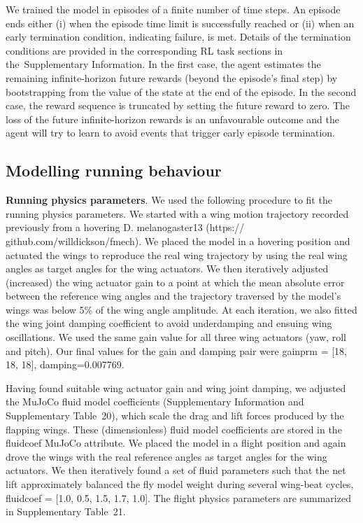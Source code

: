 \documentclass[sn-mathphys-num]{sn-jnl}%
\theoremstyle{thmstyleone}	%
\theoremstyle{thmstyletwo}	%
\theoremstyle{thmstylethree}	%
\begin{document}
We trained the model in episodes of a finite number of time steps. 
An episode ends either (i) when the episode time limit is successfully reached or (ii) when an early termination condition, indicating failure, is met. 
Details of the termination conditions are provided in the corresponding RL task sections in the Supplementary Information. 
In the first case, the agent estimates the remaining infinite-horizon future rewards (beyond the episode’s final step) by bootstrapping from the value of the state at the end of the episode. 
In the second case, the reward sequence is truncated by setting the future reward to zero. 
The loss of the future infinite-horizon rewards is an unfavourable outcome and the agent will try to learn to avoid events that trigger early episode termination.


\subsection{Modelling running behaviour}

\textbf{Running physics parameters}. 
We used the following procedure to fit the running physics parameters. 
We started with a wing motion trajectory recorded previously from a hovering D. melanogaster13 (https:// github.com/willdickson/fmech). 
We placed the model in a hovering position and actuated the wings to reproduce the real wing trajectory by using the real wing angles as target angles for the wing actuators. 
We then iteratively adjusted (increased) the wing actuator gain to a point at which the mean absolute error between the reference wing angles and the trajectory traversed by the model’s wings was below 5\% of the wing angle amplitude. 
At each iteration, we also fitted the wing joint damping coefficient to avoid underdamping and ensuing wing oscillations. 
We used the same gain value for all three wing actuators (yaw, roll and pitch).
Our final values for the gain and damping pair were gainprm = [18, 18, 18], damping=0.007769. 


Having found suitable wing actuator gain and wing joint damping, we adjusted the MuJoCo fluid model coefficients (Supplementary Information and Supplementary Table 20), which scale the drag and lift forces produced by the flapping wings. 
These (dimensionless) fluid model coefficients are stored in the fluidcoef MuJoCo attribute. 
We placed the model in a flight position and again drove the wings with the real reference angles as target angles for the wing actuators. 
We then iteratively found a set of fluid parameters such that the net lift approximately balanced the fly model weight during several wing-beat cycles, fluidcoef = [1.0, 0.5, 1.5, 1.7, 1.0].
The flight physics parameters are summarized in Supplementary Table 21.
\end{document}
